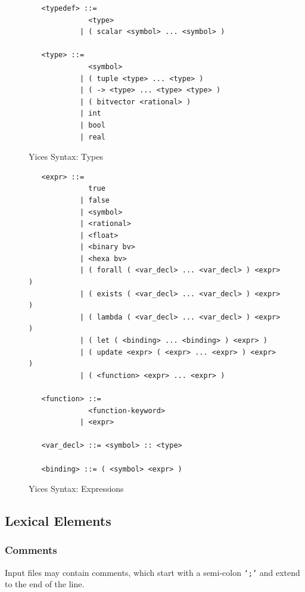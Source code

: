 \documentclass[11pt,twoside,fleqn,openright,titlepage]{cslreport}
\begin{document}
\begin{figure}
\begin{small}
\begin{verbatim}
   <typedef> ::=
              <type>
            | ( scalar <symbol> ... <symbol> )

   <type> ::=
              <symbol>
            | ( tuple <type> ... <type> )
            | ( -> <type> ... <type> <type> )
            | ( bitvector <rational> )
            | int
            | bool
            | real
\end{verbatim}
\end{small}
\caption{Yices Syntax: Types}
\label{syntax:types}
\end{figure}

\begin{figure}
\begin{small}
\begin{verbatim}
   <expr> ::=
              true
            | false
            | <symbol>
            | <rational>
            | <float>
            | <binary bv>
            | <hexa bv>
            | ( forall ( <var_decl> ... <var_decl> ) <expr> )
            | ( exists ( <var_decl> ... <var_decl> ) <expr> )
            | ( lambda ( <var_decl> ... <var_decl> ) <expr> )
            | ( let ( <binding> ... <binding> ) <expr> )
            | ( update <expr> ( <expr> ... <expr> ) <expr> )
            | ( <function> <expr> ... <expr> )

   <function> ::=
              <function-keyword>
            | <expr>

   <var_decl> ::= <symbol> :: <type>

   <binding> ::= ( <symbol> <expr> )
\end{verbatim}
\end{small}
\caption{Yices Syntax: Expressions}
\label{syntax:expressions}
\end{figure}

\subsection{Lexical  Elements}

\subsubsection*{Comments}

Input  files  may contain  comments,  which  start  with a  semi-colon
\texttt{`;'} and extend to the end of the line.
\end{document}

